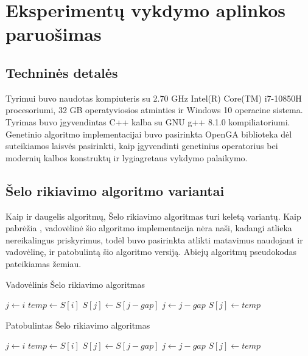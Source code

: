 \documentclass{VUMIFInfKursinis}
\begin{document}
\section{Eksperimentų vykdymo aplinkos paruošimas}

\subsection{Techninės detalės}
Tyrimui buvo naudotas kompiuteris su 2.70 GHz Intel(R) Core(TM) i7-10850H procesoriumi,
32 GB operatyviosios atminties ir Windows 10 operacine sistema.
Tyrimas buvo įgyvendintas C++ kalba su GNU g++ 8.1.0 kompiliatoriumi.
Genetinio algoritmo implementacijai buvo pasirinkta OpenGA biblioteka \cite{mohammadi2017openga}
dėl suteikiamos laisvės pasirinkti, kaip įgyvendinti genetinius operatorius bei modernių kalbos konstruktų ir lygiagretaus vykdymo palaikymo.

\subsection{Šelo rikiavimo algoritmo variantai}

Kaip ir daugelis algoritmų, Šelo rikiavimo algoritmas turi keletą variantų.
Kaip pabrėžia \cite{Radavičius_Baranauskas_2013}, vadovėlinė šio algoritmo implementacija nėra
naši, kadangi atlieka nereikalingus priskyrimus,
todėl buvo pasirinkta atlikti matavimus naudojant ir vadovėlinę, ir patobulintą šio algoritmo versiją.
Abiejų algoritmų pseudokodas pateikiamas žemiau.

\begin{algorithm}
  \caption{Vadovėlinis Šelo rikiavimo algoritmas}\label{css}
  \begin{algorithmic}[1]
      \State $j\gets i$
      \State $temp\gets S[i]$
        \State $S[j]\gets S[j - gap]$
        \State $j\gets j-gap$
      \EndWhile
      \State $S[j]\gets temp$
    \EndFor
  \EndFor
  \end{algorithmic}
\end{algorithm}

\begin{algorithm}
  \caption{Patobulintas Šelo rikiavimo algoritmas}\label{iss}
  \begin{algorithmic}[1]
        \State $j\gets i$
        \State $temp\gets S[i]$
        \Repeat
          \State $S[j]\gets S[j - gap]$
          \State $j\gets j-gap$
        \State $S[j]\gets temp$
      \EndIf
    \EndFor
  \EndFor
  \end{algorithmic}
\end{algorithm}
\end{document}
